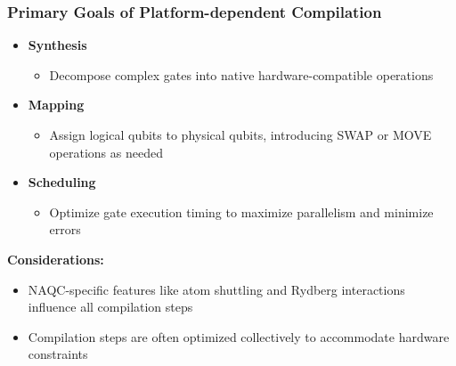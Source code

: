 \begin{frame}
    \frametitle{Primary Goals of Platform-dependent Compilation}
    \begin{itemize}
        \item \textbf{Synthesis}
            \begin{itemize}
                \item Decompose complex gates into native hardware-compatible operations
            \end{itemize}
        \item \textbf{Mapping}
            \begin{itemize}
                \item Assign logical qubits to physical qubits, introducing SWAP or MOVE operations as needed
            \end{itemize}
        \item \textbf{Scheduling}
            \begin{itemize}
                \item Optimize gate execution timing to maximize parallelism and minimize errors
            \end{itemize}
    \end{itemize}
    \vspace{0.5em}
    \textbf{Considerations:}
    \begin{itemize}
        \item NAQC-specific features like atom shuttling and Rydberg interactions influence all compilation steps
        \item Compilation steps are often optimized collectively to accommodate hardware constraints
    \end{itemize}
\end{frame}

